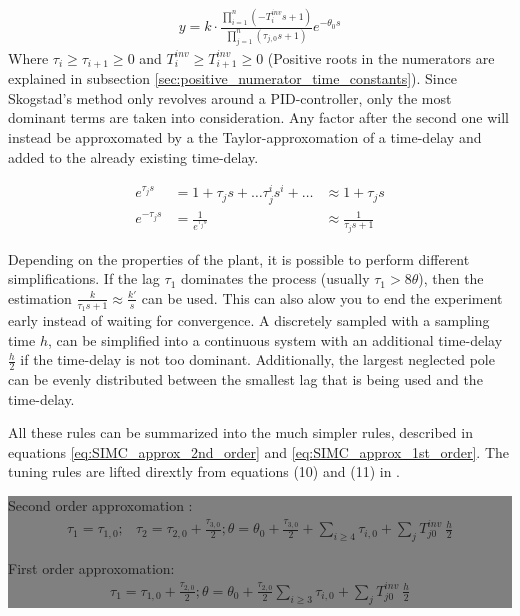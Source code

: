\begin{align}
    y = k \cdot \frac{\prod_{i=1}^{n}  \left(  - T^{inv}_i s + 1\right)}{\prod_{j=1}^{n} \left( \tau_{j,0} s +1  \right)} e^{-\theta_{0} s}
\end{align}
Where $\tau_i \geq \tau_{i+1} \geq 0$ and $T^{inv}_i \geq T^{inv}_{i+1} \ge 0$ (Positive roots in the numerators are explained in subsection \ref{sec:positive_numerator_time_constants}). Since Skogstad's method only revolves around a PID-controller, only the most dominant terms are taken into consideration. Any factor after the second one will instead be approxomated by a the Taylor-approxomation of a time-delay and added to the already existing time-delay. 

\begin{align}
    e^{\tau_j s} &= 1 + \tau_j s + \dots \tau_j^i s^i + \dots &\approx 1 + \tau_j s \\
    e^{-\tau_j s} &= \frac{1}{e^{\tau_j s}} &\approx \frac{1}{\tau_j s +1}
\end{align}

\noindent
Depending on the properties of the plant, it is possible to perform different simplifications. If the lag $\tau_1$ dominates the process (usually $\tau_1 > 8\theta$), then the estimation $\frac{k}{\tau_1 s +1} \approx \frac{k'}{s}$ can be used. This can also alow you to end the experiment early instead of waiting for convergence. 
A discretely sampled with a sampling time $h$, can be simplified into a continuous system with an additional time-delay $\frac{h}{2}$  if the time-delay is not too dominant. Additionally, the largest neglected pole can be evenly distributed between the smallest lag that is being used and the time-delay.

\noindent 
All these rules can be summarized into the much simpler rules, described in equations \ref{eq:SIMC_approx_2nd_order} and \ref{eq:SIMC_approx_1st_order}. The tuning rules are lifted dirextly from equations (10) and (11) in \cite{SIMC_source}. 

\colorbox{gray}{\begin{minipage}{\textwidth}
    Second order approxomation :
\begin{align}
    \label{eq:SIMC_approx_2nd_order}
    \tau_1 = \tau_{1,0};&\tau_2 = \tau_{2,0} + \frac{ \tau_{3,0}}{2}; \theta = \theta_0 + \frac{\tau_{3,0}}{2} + \sum_{i \ge 4} \tau_{i,0} + \sum_j T^{inv}_{j0} \ \frac{h}{2}
\end{align}

First order approxomation: 
\begin{align}
    \label{eq:SIMC_approx_1st_order}
    \tau_1 = \tau_{1,0} + \frac{\tau_{2,0}}{2} ; \theta = \theta_0 + \frac{\tau_{2,0}}{2}  \sum_{i \ge 3} \tau_{i,0} + \sum_j T^{inv}_{j0} \ \frac{h}{2}
\end{align}
\end{minipage}}


